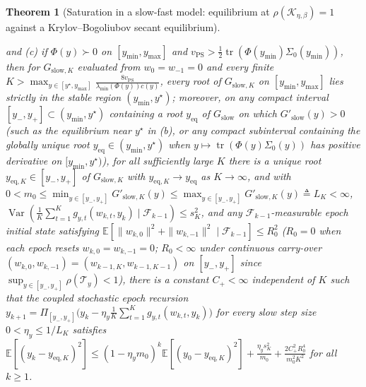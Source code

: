 \documentclass[11pt]{article}
\newtheorem{theorem}{Theorem}
\theoremstyle{remark}
\newcommand{\E}{\mathbb{E}}
\newcommand{\Var}{\operatorname{Var}}
\newcommand{\tr}{\operatorname{tr}}
\begin{document}
\begin{theorem}[Saturation in a slow-fast model: equilibrium at $\rho(\mathcal K_{\eta,\beta})=1$ against a Krylov--Bogoliubov secant equilibrium]
\begin{enumerate}
and (c) if $\Phi(y)\succ0$ on $[y_{\min},y_{\max}]$ and $v_{\mathrm{PS}}>\frac12\tr(\Phi(y_{\min})\Sigma_0(y_{\min}))$, then for $G_{\mathrm{slow},K}$ evaluated from $w_0=w_{-1}=0$ and every finite $K>\max_{y\in[y^\star,y_{\max}]}\frac{8v_{\mathrm{PS}}}{\lambda_{\min}(\Phi(y))c(y)}$, every root of $G_{\mathrm{slow},K}$ on $[y_{\min},y_{\max}]$ lies strictly in the stable region $(y_{\min},y^\star)$; moreover, on any compact interval $[y_-,y_+]\subset(y_{\min},y^\star)$ containing a root $y_{\mathrm{eq}}$ of $G_{\mathrm{slow}}$ on which $G'_{\mathrm{slow}}(y)>0$ (such as the equilibrium near $y^\star$ in (b), or any compact subinterval containing the globally unique root $y_{\mathrm{eq}}\in(y_{\min},y^\star)$ when $y\mapsto\tr(\Phi(y)\Sigma_0(y))$ has positive derivative on $[y_{\min},y^\star)$), for all sufficiently large $K$ there is a unique root $y_{\mathrm{eq},K}\in[y_-,y_+]$ of $G_{\mathrm{slow},K}$ with $y_{\mathrm{eq},K}\to y_{\mathrm{eq}}$ as $K\to\infty$, and with $0<m_0\le\min_{y\in[y_-,y_+]}G'_{\mathrm{slow},K}(y)\le\max_{y\in[y_-,y_+]}G'_{\mathrm{slow},K}(y)\triangleq L_K<\infty$, $\Var(\frac1K\sum_{t=1}^Kg_{y,t}(w_{k,t},y_k)\mid\mathcal F_{k-1})\le s_K^2$, and any $\mathcal F_{k-1}$-measurable epoch initial state satisfying $\E[\|w_{k,0}\|^2+\|w_{k,-1}\|^2\mid\mathcal F_{k-1}]\le R_0^2$ ($R_0=0$ when each epoch resets $w_{k,0}=w_{k,-1}=0$; $R_0<\infty$ under continuous carry-over $(w_{k,0},w_{k,-1})=(w_{k-1,K},w_{k-1,K-1})$ on $[y_-,y_+]$ since $\sup_{y\in[y_-,y_+]}\rho(\mathcal T_y)<1$), there is a constant $C_+<\infty$ independent of $K$ such that the coupled stochastic epoch recursion $y_{k+1}=\Pi_{[y_-,y_+]}\big(y_k-\eta_y\frac1K\sum_{t=1}^Kg_{y,t}(w_{k,t},y_k)\big)$ for every slow step size $0<\eta_y\le1/L_K$ satisfies $\E[(y_k-y_{\mathrm{eq},K})^2]\le(1-\eta_ym_0)^k\E[(y_0-y_{\mathrm{eq},K})^2]+\frac{\eta_ys_K^2}{m_0}+\frac{2C_+^2R_0^4}{m_0^2K^2}$ for all $k\ge1$.

\end{enumerate}
\end{theorem}
\end{document}
